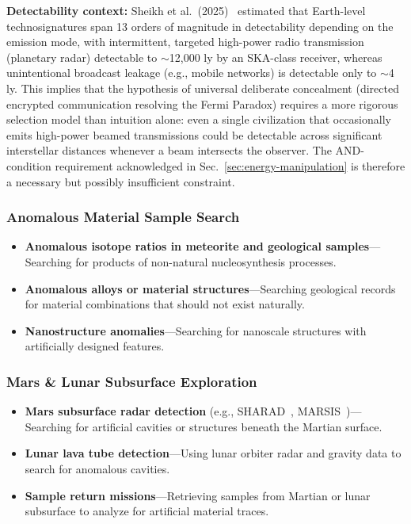 \documentclass[aps,prd,twocolumn,superscriptaddress,nofootinbib]{revtex4-2}
\begin{document}
\textbf{Detectability context:} Sheikh et al.\ (2025)~\cite{Sheikh2025} estimated that Earth-level technosignatures span 13 orders of magnitude in detectability depending on the emission mode, with intermittent, targeted high-power radio transmission (planetary radar) detectable to ${\sim}$12,000 ly by an SKA-class receiver, whereas unintentional broadcast leakage (e.g., mobile networks) is detectable only to ${\sim}$4 ly. This implies that the hypothesis of universal deliberate concealment (directed encrypted communication resolving the Fermi Paradox) requires a more rigorous selection model than intuition alone: even a single civilization that occasionally emits high-power beamed transmissions could be detectable across significant interstellar distances whenever a beam intersects the observer. The AND-condition requirement acknowledged in Sec.~\ref{sec:energy-manipulation} is therefore a necessary but possibly insufficient constraint.

\subsubsection{Anomalous Material Sample Search}\label{sec:anomalous-materials}

\begin{itemize}
  \item \textbf{Anomalous isotope ratios in meteorite and geological samples}---Searching for products of non-natural nucleosynthesis processes.
  \item \textbf{Anomalous alloys or material structures}---Searching geological records for material combinations that should not exist naturally.
  \item \textbf{Nanostructure anomalies}---Searching for nanoscale structures with artificially designed features.
\end{itemize}

\subsubsection{Mars \& Lunar Subsurface Exploration}\label{sec:mars-lunar}

\begin{itemize}
  \item \textbf{Mars subsurface radar detection} (e.g., SHARAD~\cite{NASA_SHARAD}, MARSIS~\cite{ESA_MARSIS})---Searching for artificial cavities or structures beneath the Martian surface.
  \item \textbf{Lunar lava tube detection}---Using lunar orbiter radar and gravity data to search for anomalous cavities.
  \item \textbf{Sample return missions}---Retrieving samples from Martian or lunar subsurface to analyze for artificial material traces.
\end{itemize}
\end{document}
